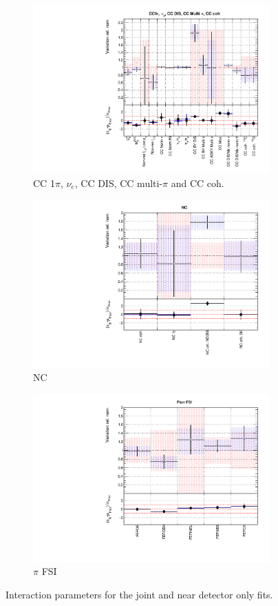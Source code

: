 \begin{figure}[!htbp]
\begin{subfigure}{0.49\textwidth}
  \centering
  \includegraphics[width=0.9\linewidth]{figs/jointxsec3}
  \caption{CC 1$\pi$, $\nu_e$, CC DIS, CC multi-$\pi$ and CC coh.}
\end{subfigure}
\begin{subfigure}{0.45\textwidth}
  \centering
  \includegraphics[width=0.9\linewidth]{figs/jointxsec4}
  \caption{NC}
\end{subfigure}
\begin{subfigure}{0.49\textwidth}
  \centering
  \includegraphics[width=0.9\linewidth]{figs/jointxsec5}
  \caption{$\pi$ FSI}
\end{subfigure}
\caption{Interaction parameters for the joint and near detector only fits.}
\label{fig:jointxsec}
\end{figure}

